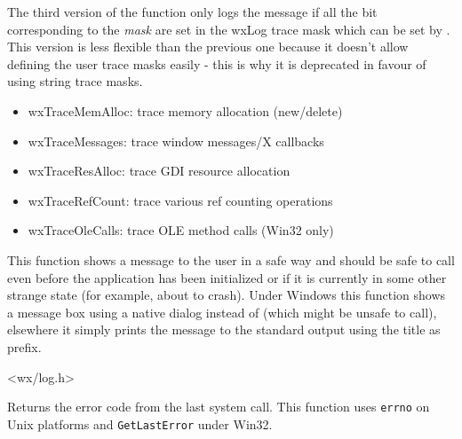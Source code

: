 The third version of the function only logs the message if all the bit
corresponding to the {\it mask} are set in the wxLog trace mask which can be
set by . This version is less
flexible than the previous one because it doesn't allow defining the user
trace masks easily - this is why it is deprecated in favour of using string
trace masks.

\begin{itemize}\itemsep=0pt
\item wxTraceMemAlloc: trace memory allocation (new/delete)
\item wxTraceMessages: trace window messages/X callbacks
\item wxTraceResAlloc: trace GDI resource allocation
\item wxTraceRefCount: trace various ref counting operations
\item wxTraceOleCalls: trace OLE method calls (Win32 only)
\end{itemize}

\label{wxsafeshowmessage}


This function shows a message to the user in a safe way and should be safe to
call even before the application has been initialized or if it is currently in
some other strange state (for example, about to crash). Under Windows this
function shows a message box using a native dialog instead of 
 (which might be unsafe to call), elsewhere
it simply prints the message to the standard output using the title as prefix.







<wx/log.h>

\label{wxsyserrorcode}


Returns the error code from the last system call. This function uses
{\tt errno} on Unix platforms and {\tt GetLastError} under Win32.

